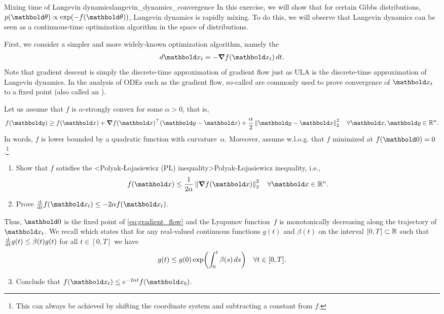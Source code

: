 \begin{nexercise}{Mixing time of Langevin dynamics}{langevin_dynamics_convergence}
  In this exercise, we will show that for certain Gibbs distributions, ${p(\vtheta) \propto \exp(-f(\vtheta))}$, Langevin dynamics is rapidly mixing.
  To do this, we will observe that Langevin dynamics can be seen as a continuous-time optimization algorithm in the space of distributions.

  First, we consider a simpler and more widely-known optimization algorithm, namely the  \begin{align}
    d \vx_t = - \grad f(\vx_t) \,d t. \label{eq:gradient_flow}
  \end{align}
  Note that gradient descent is simply the discrete-time approximation of gradient flow just as ULA is the discrete-time approximation of Langevin dynamics.
  In the analysis of ODEs such as the gradient flow, so-called  are commonly used to prove convergence of $\vx_t$ to a fixed point (also called an ).

  Let us assume that $f$ is $\alpha$-strongly convex for some $\alpha > 0$, that is, \begin{align}
    f(\vy) \geq f(\vx) + \transpose{\grad f(\vx)}(\vy - \vx) + \frac{\alpha}{2} \norm{\vy - \vx}_2^2 \quad \forall \vx, \vy \in \R^n. \label{eq:strongly_convex}
  \end{align}
  In words, $f$ is lower bounded by a quadratic function with curvature~$\alpha$.
  Moreover, assume w.l.o.g. that $f$ minimized at $f(\vzero) = 0$.\footnote{This can always be achieved by shifting the coordinate system and subtracting a constant from $f$.}
  \begin{enumerate}
    \item Show that $f$ satisfies the \midx<Polyak-Łojasiewicz (PL) inequality>{Polyak-Łojasiewicz inequality}, i.e., \begin{align}
      f(\vx) \leq \frac{1}{2 \alpha} \norm{\grad f(\vx)}_2^2 \quad \forall \vx \in \R^n. \label{eq:polyak_lojasiewicz}
    \end{align}

    \item Prove $\odv{}{t} f(\vx_t) \leq - 2 \alpha f(\vx_t)$.
  \end{enumerate}
  Thus, $\vzero$ is the fixed point of \cref{eq:gradient_flow} and the Lyapunov function~$f$ is monotonically decreasing along the trajectory of $\vx_t$.
  We recall  which states that for any real-valued continuous functions $g(t)$ and $\beta(t)$ on the interval $[0, T] \subset \mathbb{R}$ such that ${\odv{}{t} g(t) \leq \beta(t) g(t)}$ for all $t \in [0, T]$ we have \begin{align}
    g(t) \leq g(0) \exp\parentheses*{\int_0^t \beta(s) \,d s} \quad \forall t \in [0, T]. \label{eq:groenwall}
  \end{align}
  \begin{enumerate}
    \setcounter{enumi}{2}
    \item Conclude that $f(\vx_t) \leq e^{-2 \alpha t} f(\vx_0)$.
  \end{enumerate} \vspace{\baselineskip}


\end{nexercise}
